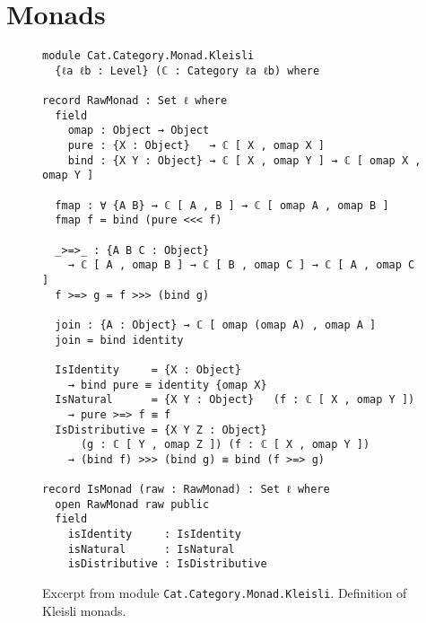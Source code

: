 \section{Monads}
\label{sec:app-monads}
\begin{figure}[h]
\begin{Verbatim}
module Cat.Category.Monad.Kleisli
  {ℓa ℓb : Level} (ℂ : Category ℓa ℓb) where

record RawMonad : Set ℓ where
  field
    omap : Object → Object
    pure : {X : Object}   → ℂ [ X , omap X ]
    bind : {X Y : Object} → ℂ [ X , omap Y ] → ℂ [ omap X , omap Y ]

  fmap : ∀ {A B} → ℂ [ A , B ] → ℂ [ omap A , omap B ]
  fmap f = bind (pure <<< f)

  _>=>_ : {A B C : Object}
    → ℂ [ A , omap B ] → ℂ [ B , omap C ] → ℂ [ A , omap C ]
  f >=> g = f >>> (bind g)

  join : {A : Object} → ℂ [ omap (omap A) , omap A ]
  join = bind identity

  IsIdentity     = {X : Object}
    → bind pure ≡ identity {omap X}
  IsNatural      = {X Y : Object}   (f : ℂ [ X , omap Y ])
    → pure >=> f ≡ f
  IsDistributive = {X Y Z : Object}
      (g : ℂ [ Y , omap Z ]) (f : ℂ [ X , omap Y ])
    → (bind f) >>> (bind g) ≡ bind (f >=> g)

record IsMonad (raw : RawMonad) : Set ℓ where
  open RawMonad raw public
  field
    isIdentity     : IsIdentity
    isNatural      : IsNatural
    isDistributive : IsDistributive
\end{Verbatim}
\caption{Excerpt from module \texttt{Cat.Category.Monad.Kleisli}. Definition of
  Kleisli monads.}
\end{figure}
%
